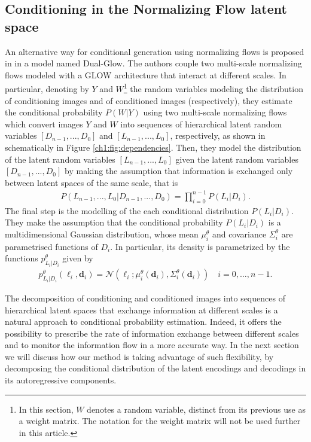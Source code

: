 \subsection{Conditioning in the Normalizing Flow latent space}
An alternative way for conditional generation using normalizing flows is proposed in \cite{Dual-Glow} in a model named Dual-Glow. The authors couple two multi-scale normalizing flows modeled with a GLOW architecture that interact at different scales. %
In particular, denoting by $Y$ and $W$\footnote{In this section, $W$ denotes a random variable, distinct from its previous use as a weight matrix. The notation for the weight matrix will not be used further in this article.} the random variables modeling the distribution of conditioning images and of conditioned images (respectively), they estimate the conditional probability $P(W|Y)$ using two multi-scale normalizing flows which convert images $Y$ and $W$ into sequences of hierarchical latent random variables $[D_{n-1}, ..., D_0]$ and $ [L_{n-1}, ..., L_0]$, respectively, as shown in schematically in Figure \ref{ch1:fig:dependencies}. 
Then, they model the distribution of the latent random variables $ [L_{n-1}, ..., L_0]$ given the latent random variables $[D_{n-1}, ..., D_0]$ by making the assumption that information is exchanged only between latent spaces of the same scale, that is \begin{align}\label{ch1:eq:Dual-Glowdep}
P(L_{n-1}, ..., L_0|D_{n-1}, ..., D_0)  = \prod_{i=0}^{n-1}P(L_{i}|D_{i}).
\end{align}
The final step is the modelling of the each conditional distribution  $P(L_{i}|D_{i})$. They make the assumption that the conditional probability $P(L_{i}|D_{i})$ is a multidimensional Gaussian distribution, whose mean $\mu_i^{\theta}$ and covariance $\Sigma_i^{\theta}$ are parametrised functions of $D_{i}$. In particular, its density is parametrized by the functions $p_{L_{i}|D_{i}}^\theta$ given by
\begin{align}\label{ch1:eq:Dual-Glowdep}
p^\theta_{L_{i}|D_{i}}(\boldsymbol{\ell}_i, \boldsymbol{d}_i)  = \mathcal{N}(\boldsymbol{\ell}_i; \mu_i^{\theta}(\boldsymbol{d}_{i}), \Sigma_i^{\theta}(\boldsymbol{d}_i)) \quad i = 0,\ldots, n-1.
\end{align}


The decomposition of conditioning and conditioned images into sequences of hierarchical latent spaces that exchange information at different scales is a natural approach to conditional probability estimation. Indeed, it offers the possibility to prescribe the rate of information exchange between different scales and to monitor the information flow in a more accurate way. In the next section we will discuss how our method is taking advantage of such flexibility, by decomposing the conditional distribution of the latent encodings and decodings in its autoregressive components.

